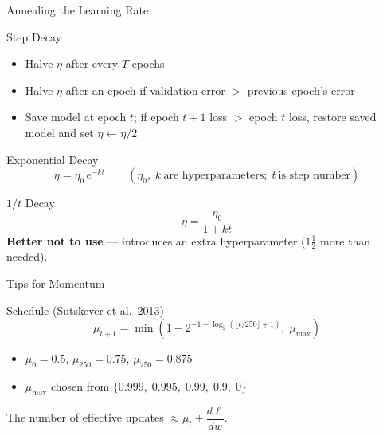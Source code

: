 \documentclass{beamer}
\begin{document}
\begin{frame}[shrink=10]{Annealing the Learning Rate}
  \begin{block}{Step Decay}
    \begin{itemize}\setlength\itemsep{5pt}
      \item Halve $\eta$ after every $T$ epochs
      \item Halve $\eta$ after an epoch if validation error
            $>$ previous epoch's error
      \item Save model at epoch $t$; if epoch $t{+}1$ loss $>$
            epoch $t$ loss, restore saved model and set
            $\eta \leftarrow \eta/2$
    \end{itemize}
  \end{block}

  \medskip

  \begin{block}{Exponential Decay}
    \[
      \eta = \eta_0\,e^{-kt}
      \qquad
      (\eta_0,\;k\ \text{are hyperparameters};\;t\ \text{is step number})
    \]
  \end{block}

  \medskip

  \begin{block}{$1/t$ Decay}
    \[
      \eta = \frac{\eta_0}{1+kt}
    \]
    \textbf{Better not to use} --- introduces an extra hyperparameter
    ($1\tfrac{1}{2}$ more than needed).
  \end{block}
\end{frame}

\begin{frame}[shrink=10]{Tips for Momentum}
  \begin{block}{Schedule (Sutskever et al.\ 2013)}
    \[
      \mu_{t+1}
        = \min\!\left(
            1 - 2^{-1-\log_2\!\left(\lfloor t/250\rfloor+1\right)},\;
            \mu_{\max}
          \right)
    \]
    \begin{itemize}\setlength\itemsep{5pt}
      \item $\mu_0 = 0.5$,\quad
            $\mu_{250} = 0.75$,\quad
            $\mu_{750} = 0.875$
      \item $\mu_{\max}$ chosen from
            $\{0.999,\;0.995,\;0.99,\;0.9,\;0\}$
    \end{itemize}
    The number of effective updates
    $\approx \mu_t + \dfrac{d\ell}{dw}$.
  \end{block}
\end{frame}
\end{document}
